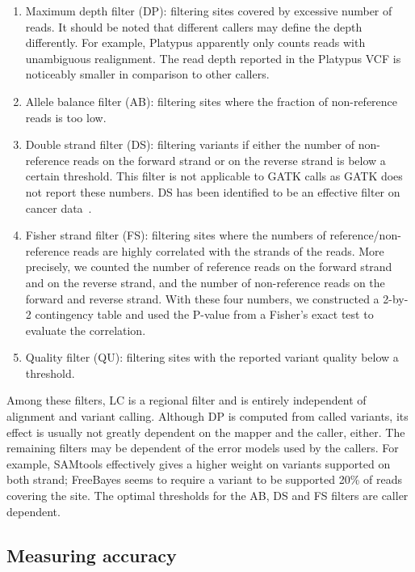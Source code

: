 \documentclass{bioinfo-ori}
\begin{document}
\begin{methods}
\begin{enumerate}
\item Maximum depth filter (DP): filtering sites covered by excessive number of
reads. It should be noted that different callers may define the depth
differently. For example, Platypus apparently only counts reads with
unambiguous realignment. The read depth reported in the Platypus VCF is
noticeably smaller in comparison to other callers.

\item Allele balance filter (AB): filtering sites where the fraction of
non-reference reads is too low.

\item Double strand filter (DS): filtering variants if either the number of
non-reference reads on the forward strand or on the reverse strand is below a
certain threshold. This filter is not applicable to GATK calls as GATK does not
report these numbers. DS has been identified to be an effective filter on
cancer data~\citep{Roberts:2013aa,Kim:2013aa}.

\item Fisher strand filter (FS): filtering sites where the numbers of
reference/non-reference reads are highly correlated with the strands of the
reads. More precisely, we counted the number of reference reads on the forward
strand and on the reverse strand, and the number of non-reference reads on the
forward and reverse strand. With these four numbers, we constructed a 2-by-2
contingency table and used the P-value from a Fisher's exact test to evaluate
the correlation.

\item Quality filter (QU): filtering sites with the reported variant quality
below a threshold.

\end{enumerate}

Among these filters, LC is a regional filter and is entirely independent of
alignment and variant calling. Although DP is computed from called
variants, its effect is usually not greatly dependent on the mapper and the caller,
either. The remaining filters may be dependent of the error models used by the
callers. For example, SAMtools effectively gives a higher weight on variants
supported on both strand; FreeBayes seems to require a variant to be supported
20\% of reads covering the site. The optimal thresholds for the AB, DS and FS
filters are caller dependent.

\subsection{Measuring accuracy}


\end{methods}
\end{document}
